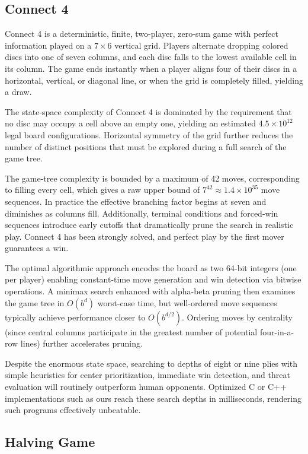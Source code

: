 \documentclass[12pt]{article}
\begin{document}
\subsection{Connect 4}

Connect 4 is a deterministic, finite, two-player, zero-sum game with perfect information played on a $7\times6$ vertical grid. Players alternate dropping colored discs into one of seven columns, and each disc falls to the lowest available cell in its column. The game ends instantly when a player aligns four of their discs in a horizontal, vertical, or diagonal line, or when the grid is completely filled, yielding a draw.

The state-space complexity of Connect 4 is dominated by the requirement that no disc may occupy a cell above an empty one, yielding an estimated $4.5\times10^{12}$ legal board configurations. Horizontal symmetry of the grid further reduces the number of distinct positions that must be explored during a full search of the game tree.

The game-tree complexity is bounded by a maximum of 42 moves, corresponding to filling every cell, which gives a raw upper bound of $7^{42}\approx1.4\times10^{35}$ move sequences. In practice the effective branching factor begins at seven and diminishes as columns fill. Additionally, terminal conditions and forced-win sequences introduce early cutoffs that dramatically prune the search in realistic play. Connect 4 has been strongly solved, and perfect play by the first mover guarantees a win.

The optimal algorithmic approach encodes the board as two 64-bit integers (one per player) enabling constant-time move generation and win detection via bitwise operations. A minimax search enhanced with alpha-beta pruning then examines the game tree in $O(b^d)$ worst-case time, but well-ordered move sequences typically achieve performance closer to $O(b^{d/2})$. Ordering moves by centrality (since central columns participate in the greatest number of potential four-in-a-row lines) further accelerates pruning.

Despite the enormous state space, searching to depths of eight or nine plies with simple heuristics for center prioritization, immediate win detection, and threat evaluation will routinely outperform human opponents. Optimized C or C++ implementations such as ours reach these search depths in milliseconds, rendering such programs effectively unbeatable.

\subsection{Halving Game}
\end{document}
